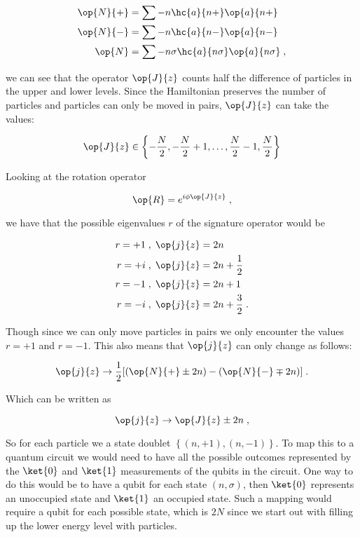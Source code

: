 \begin{align}
    \op{N}{+} &= \sum-{n} \hc{a}{n+}\op{a}{n+} \\
    \op{N}{-} &= \sum-{n} \hc{a}{n-}\op{a}{n-} \\
    \op{N} &= \sum-{n\sigma} \hc{a}{n\sigma}\op{a}{n\sigma} \; ,
\end{align}

we can see that the operator $\op{J}{z}$ counts half the difference of particles in the upper and lower levels. Since the Hamiltonian preserves the number of particles and particles can only be moved in pairs, $\op{J}{z}$ can take the values:

\begin{equation}
    \op{J}{z} \in \left \{ -\frac{N}{2}, -\frac{N}{2}+1, \dots , \frac{N}{2} - 1, \frac{N}{2} \right \}
\end{equation}

Looking at the rotation operator

$$\op{R} = e^{i \phi \op{J}{z}} \; ,$$

we have that the possible eigenvalues $r$ of the signature operator would be

\begin{align}
    r = +1 \; &, \; \op{j}{z} = 2n \\
    r = +i \; &, \; \op{j}{z} = 2n + \frac{1}{2}\\
    r = -1 \; &, \; \op{j}{z} = 2n + 1\\
    r = -i \; &, \; \op{j}{z} = 2n + \frac{3}{2} \; .
\end{align}

Though since we can only move particles in pairs we only encounter the values $r = +1$ and $r= -1$. This also means that $\op{j}{z}$ can only change as follows:

$$\op{j}{z} \rightarrow \frac{1}{2}[(\op{N}{+}\pm 2n)-(\op{N}{-}\mp 2n)] \; .$$

Which can be written as

$$\op{j}{z} \rightarrow \op{J}{z} \pm 2n \; ,$$

So for each particle we a state doublet $ \left \{ (n, +1) , (n, -1) \right \} $. To map this to a quantum circuit we would need to have all the possible outcomes represented by the $\ket{0}$ and $\ket{1}$ measurements of the qubits in the circuit. One way to do this would be to have a qubit for each state $(n, \sigma)$, then $\ket{0}$ represents an unoccupied state and $\ket{1}$ an occupied state. Such a mapping would require a qubit for each possible state, which is $2N$ since we start out with filling up the lower energy level with particles. 

